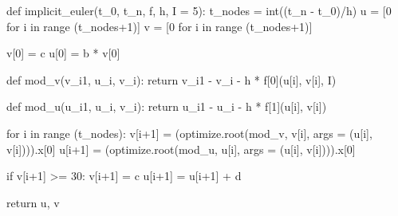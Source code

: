 \begin{python}
def implicit_euler(t_0, t_n, f, h, I = 5):
    t_nodes = int((t_n - t_0)/h)
    u = [0 for i in range (t_nodes+1)]
    v = [0 for i in range (t_nodes+1)]

    v[0] = c
    u[0] = b * v[0]

    def mod_v(v_i1, u_i, v_i):
      return v_i1 - v_i - h * f[0](u[i], v[i], I)
    
    def mod_u(u_i1, u_i, v_i):
      return u_i1 - u_i - h * f[1](u[i], v[i])

    for i in range (t_nodes):
      v[i+1] = (optimize.root(mod_v, v[i], args = (u[i], v[i]))).x[0]
      u[i+1] = (optimize.root(mod_u, u[i], args = (u[i], v[i]))).x[0]

      if v[i+1] >= 30:
        v[i+1] = c
        u[i+1] = u[i+1] + d  

    return u, v
\end{python}
